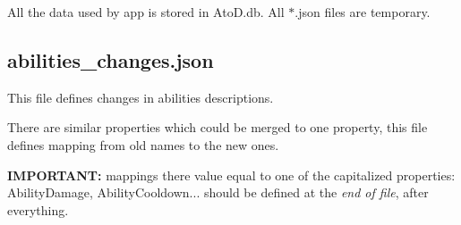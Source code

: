 All the data used by app is stored in Ato\+D.\+db. All $\ast$.json files are temporary.

\subsection*{abilities\+\_\+changes.\+json}

This file defines changes in abilities descriptions.

There are similar properties which could be merged to one property, this file defines mapping from old names to the new ones.

{\bfseries I\+M\+P\+O\+R\+T\+A\+NT\+:} mappings there value equal to one of the capitalized properties\+: Ability\+Damage, Ability\+Cooldown... should be defined at the {\itshape end of file}, after everything. 